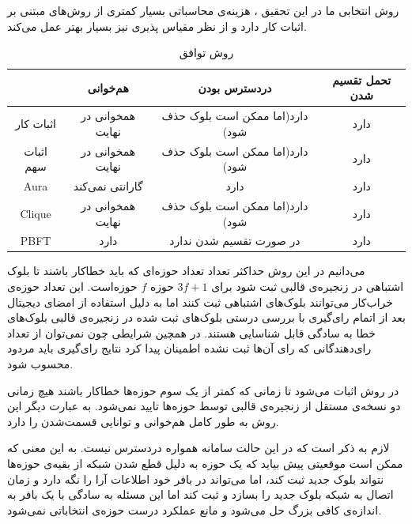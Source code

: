 روش انتخابی ما در این تحقیق
، هزینه‌ی محاسباتی بسیار کمتری از روش‌های مبتنی بر اثبات کار دارد و از نظر مقیاس پذیری
\cite{PBFperf}
نیز بسیار بهتر عمل می‌کند.

\begin{table}[th!]
	\begin{center}
		\caption{روش توافق}
		\begin{tabular}{|c|c|c|c|}
			\hline
			& هم‌خوانی & دردسترس بودن & تحمل تقسیم شدن \\
			\hline
			اثبات کار & همخوانی‌ در نهایت & دارد(اما ممکن است بلوک حذف شود) & دارد \\
			\hline
			اثبات سهم & همخوانی‌ در نهایت & دارد(اما ممکن است بلوک حذف شود) & دارد \\
			\hline
			Aura & گارانتی نمی‌کند & دارد & دارد \\
			\hline
			Clique & همخوانی‌ در نهایت & دارد(اما ممکن است بلوک حذف شود) & دارد \\
			\hline
			PBFT & دارد & در صورت تقسیم شدن ندارد & دارد \\
			\hline
		\end{tabular}
		\label{tab:cons}
	\end{center}
\end{table}

\par
می‌دانیم در این روش حداکثر تعداد تعداد حوزه‌ای که باید خطاکار باشند تا بلوک اشتباهی در زنجیره‌ی قالبی ثبت شود برای 
$3f + 1$
حوزه $f$ حوزه‌است.
این تعداد حوزه‌ی خراب‌کار می‌توانند بلوک‌های اشتباهی ثبت کنند اما به دلیل استفاده از امضای دیجیتال بعد از اتمام رای‌گیری با بررسی درستی بلوک‌های ثبت شده در زنجیره‌ی قالبی بلوک‌های خطا به سادگی قابل شناسایی هستند. در همچین شرایطی چون نمی‌توان از تعداد رای‌دهندگانی که رای‌ آن‌ها ثبت نشده اطمینان پیدا کرد نتایج رای‌گیری باید مردود محسوب شود. 
\par
در روش  اثبات می‌شود 
\cite{bftcap}
تا زمانی که کمتر از یک سوم حوزه‌ها خطاکار باشند هیچ زمانی دو نسخه‌ی مستقل از زنجیره‌ی قالبی توسط حوزه‌ها تایید نمی‌شود. به عبارت دیگر این روش به طور کامل هم‌خوانی و توانایی قسمت‌شدن را دارد.
\par
لازم به ذکر است که در این حالت سامانه همواره دردسترس نیست. به این معنی که ممکن است موقعیتی پیش بیاید که یک حوزه به دلیل قطع شدن شبکه از بقیه‌ی حوزه‌ها نتواند بلوک جدید ثبت کند، اما می‌تواند در بافر خود اطلاعات آرا را نگه دارد و زمان اتصال به شبکه بلوک جدید را بسازد و ثبت کند اما این مسئله به سادگی با یک بافر به اندازه‌ی کافی بزرگ حل می‌شود و مانع عملکرد درست حوزه‌ی انتخاباتی نمی‌شود.

